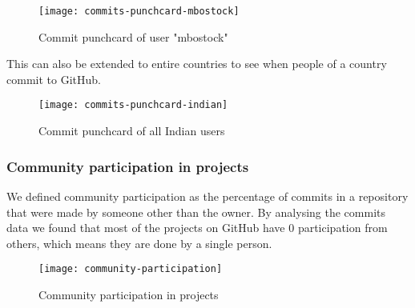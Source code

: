 \begin{figure}[htb]
\centering
\texttt{[image: commits-punchcard-mbostock]}
\caption{Commit punchcard of user "mbostock"}
\end{figure}

This can also be extended to entire countries to see when people of a country commit to GitHub.

\begin{figure}[htb]
\centering
\texttt{[image: commits-punchcard-indian]}
\caption{Commit punchcard of all Indian users}
\end{figure}

\newpage
\subsubsection{Community participation in projects}

We defined community participation as the percentage of commits in a repository that were made
by someone other than the owner. By analysing the commits data we found that most of the projects
on GitHub have 0 participation from others, which means they are done by a single person.

\begin{figure}[htb]
\centering
\centerline{\texttt{[image: community-participation]}}
\caption{Community participation in projects}
\end{figure}
